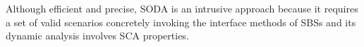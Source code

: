 \vspace{0.15cm}

Although efficient and precise, SODA is an intrusive approach because it requires a set of valid scenarios concretely invoking the interface methods of SBSs and its dynamic analysis involves SCA properties. 

%
%
%
